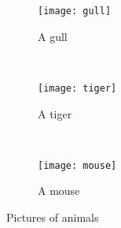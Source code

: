 \usepackage{subcaption}

\begin{figure}
        \centering
        \begin{subfigure}[b]{0.3\textwidth}
                \texttt{[image: gull]}
                \caption{A gull}
                \label{fig:gull}
        \end{subfigure}%
        ~ %
        \begin{subfigure}[b]{0.3\textwidth}
                \texttt{[image: tiger]}
                \caption{A tiger}
                \label{fig:tiger}
        \end{subfigure}
        ~ %
        \begin{subfigure}[b]{0.3\textwidth}
                \texttt{[image: mouse]}
                \caption{A mouse}
                \label{fig:mouse}
        \end{subfigure}
        \caption{Pictures of animals}\label{fig:animals}
\end{figure}